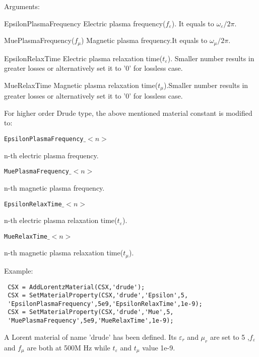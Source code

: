  \begin{FontDescr}{Arguments:}  
 
  \begin{FontPara}{EpsilonPlasmaFrequency}
  Electric plasma frequency($f_{\varepsilon}$). It equals to   $\omega_{\varepsilon}/2\pi$. 
  \end{FontPara} 
  \begin{FontPara}{MuePlasmaFrequency}($f_{\mu}$)
  Magnetic plasma frequency.It equals to $\omega_{\mu}/2\pi$.   
  \end{FontPara}
  \begin{FontPara}{EpsilonRelaxTime}   
   Electric plasma relaxation time($t_{\varepsilon}$). Smaller number results in greater losses or alternatively set it to '0' for lossless case. 
   \end{FontPara}
  \begin{FontPara}{MueRelaxTime}  
  Magnetic plasma relaxation time($t_{\mu}$).Smaller number results in greater losses or alternatively set it to '0' for lossless case.
 \end{FontPara}

For higher order Drude type, the above mentioned material constant is modified to: 

 \textcolor{varcol}{\texttt{EpsilonPlasmaFrequency$\_<n>$}}
\begin{myindentpar}
 n-th electric plasma frequency.
\end{myindentpar} 
  \textcolor{varcol}{\texttt{MuePlasmaFrequency$\_<n>$} }  
  \begin{myindentpar}
  n-th magnetic plasma frequency. 
  \end{myindentpar} 
  \textcolor{varcol}{\texttt{EpsilonRelaxTime$\_<n>$}} 
   \begin{myindentpar}
   n-th electric plasma relaxation time($t_{\varepsilon}$).   \end{myindentpar} 
 \textcolor{varcol}{\texttt{MueRelaxTime$\_<n>$}} 
\begin{myindentpar}
n-th magnetic plasma relaxation time($t_{\mu}$).
 \end{myindentpar}  
\end{FontDescr}  


\begin{FontDescr}{Example:}  
\begin{lstlisting} 
 CSX = AddLorentzMaterial(CSX,'drude');
 CSX = SetMaterialProperty(CSX,'drude','Epsilon',5,
 'EpsilonPlasmaFrequency',5e9,'EpsilonRelaxTime',1e-9);
 CSX = SetMaterialProperty(CSX,'drude','Mue',5,
 'MuePlasmaFrequency',5e9,'MueRelaxTime',1e-9);
\end{lstlisting}
  
  A Lorent material of name 'drude' has been defined. Its $\varepsilon_{r}$ and $\mu_{r}$ are set to 5 ,$f_{\varepsilon}$ and $f_{\mu}$ are both at 500M Hz while $t_{\varepsilon}$ and $t_{\mu}$ value 1e-9. 
 \end{FontDescr}
  
  
  